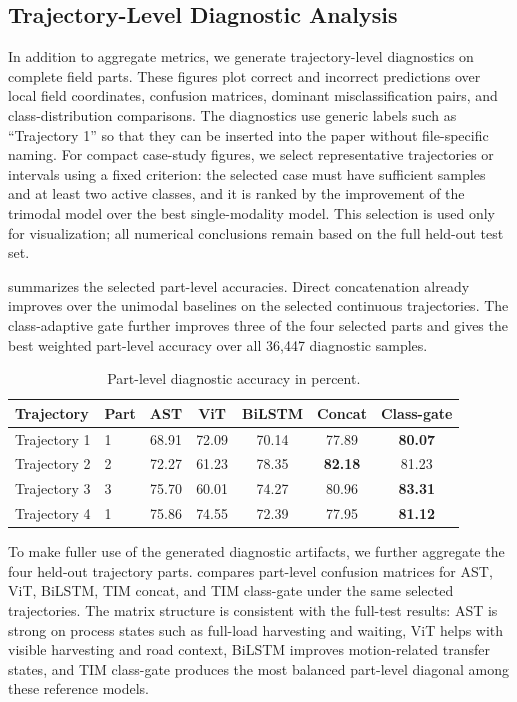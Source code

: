\subsection{Trajectory-Level Diagnostic Analysis}

In addition to aggregate metrics, we generate trajectory-level diagnostics on complete field parts. These figures plot correct and incorrect predictions over local field coordinates, confusion matrices, dominant misclassification pairs, and class-distribution comparisons. The diagnostics use generic labels such as ``Trajectory 1'' so that they can be inserted into the paper without file-specific naming. For compact case-study figures, we select representative trajectories or intervals using a fixed criterion: the selected case must have sufficient samples and at least two active classes, and it is ranked by the improvement of the trimodal model over the best single-modality model. This selection is used only for visualization; all numerical conclusions remain based on the full held-out test set.

 summarizes the selected part-level accuracies. Direct concatenation already improves over the unimodal baselines on the selected continuous trajectories. The class-adaptive gate further improves three of the four selected parts and gives the best weighted part-level accuracy over all 36,447 diagnostic samples.

\begin{table}[t]
\centering
\caption{Part-level diagnostic accuracy in percent.}
\label{tab:part_diag}
\small
\begin{tabular}{llccccc}
\toprule
\textbf{Trajectory} & \textbf{Part} & \textbf{AST} & \textbf{ViT} & \textbf{BiLSTM} & \textbf{Concat} & \textbf{Class-gate} \\
\midrule
Trajectory 1 & 1 & 68.91 & 72.09 & 70.14 & 77.89 & \textbf{80.07} \\
Trajectory 2 & 2 & 72.27 & 61.23 & 78.35 & \textbf{82.18} & 81.23 \\
Trajectory 3 & 3 & 75.70 & 60.01 & 74.27 & 80.96 & \textbf{83.31} \\
Trajectory 4 & 1 & 75.86 & 74.55 & 72.39 & 77.95 & \textbf{81.12} \\
\bottomrule
\end{tabular}
\end{table}

To make fuller use of the generated diagnostic artifacts, we further aggregate the four held-out trajectory parts.  compares part-level confusion matrices for AST, ViT, BiLSTM, TIM concat, and TIM class-gate under the same selected trajectories. The matrix structure is consistent with the full-test results: AST is strong on process states such as full-load harvesting and waiting, ViT helps with visible harvesting and road context, BiLSTM improves motion-related transfer states, and TIM class-gate produces the most balanced part-level diagonal among these reference models.

